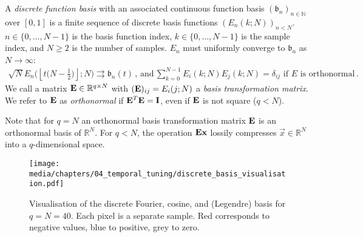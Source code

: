 \begin{definition}
	\label{def:discrete_function_basis}
 	A \emph{discrete function basis} with an associated continuous function basis $(\mathfrak{b}_n)_{n \in \mathbb{N}}$ over $[0, 1]$ is a finite sequence of discrete basis functions $(E_n(k; N))_{n < N}$.
 	$n \in \{0, \ldots, N - 1\}$ is the basis function index, $k \in \{0, \ldots, N - 1\}$ is the sample index, and $N \geq 2$ is the number of samples. $E_n$ must uniformly converge to $\mathfrak{b}_n$ as $N \to \infty$:
 	\begin{align}
 		\sqrt{N} E_n \bigl(\left\lfloor t \bigl(N - \tfrac{1}2\bigr) \right\rfloor ; N \bigr) \rightrightarrows \mathfrak{b}_n(t) \,,
 		\,\text{and}\,
 		\sum\nolimits_{k = 0}^{N - 1} E_i(k; N) E_j(k; N) = \delta_{ij} \text{ if } E \text{ is orthonormal}\,.
 		\label{eqn:discrete_basis}
 	\end{align}
 	We call a matrix $\mathbf{E} \in \mathbb{R}^{q \times N}$ with $(\mathbf{E})_{ij} = E_i(j; N)$ a \emph{basis transformation matrix}.
	We refer to $\mathbf{E}$ as \emph{orthonormal} if $\mathbf{E}^T \mathbf{E} = \mathbf{I}$, even if $\mathbf{E}$ is not square ($q < N$).
\end{definition}

Note that for $q = N$ an orthonormal basis transformation matrix $\mathbf{E}$ is an orthonormal basis of $\mathbb{R}^N$.
For $q < N$, the operation $\mathbf{E} \mathbf{x}$ lossily compresses $\vec x \in \mathbb{R}^N$ into a $q$-dimensional space.

\begin{figure}[t]
	\centering
	\texttt{[image: media/chapters/04\_temporal\_tuning/discrete\_basis\_visualisation.pdf]}%
	{\label{fig:discrete_fourier}}%
	{\label{fig:discrete_cosine}}%
	{\label{fig:discrete_dlop}}%
	\caption[Visualisation of the discrete Fourier, cosine, and Legendre basis]{Visualisation of the discrete Fourier, cosine, and \DLOP (Legendre) basis for $q = N = 40$.
	Each pixel is a separate sample. Red corresponds to negative values, blue to positive, grey to zero.}
\end{figure}


